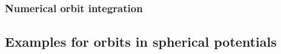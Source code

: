 \subsubsection{Numerical orbit integration}
\subsection{Examples for orbits in spherical potentials}
